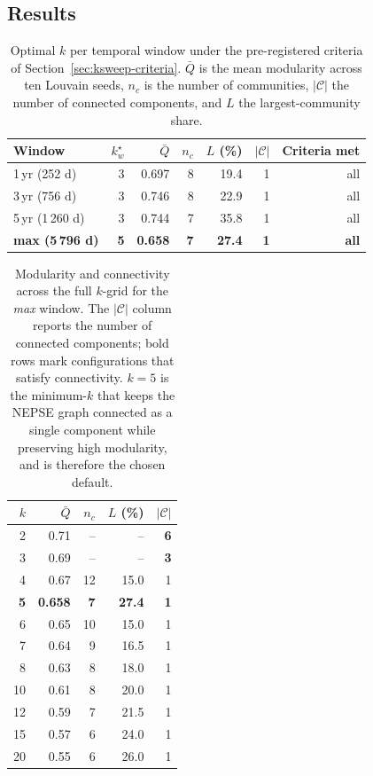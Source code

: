 \subsection{Results}
\label{sec:ksweep-results}

\begin{table}[H]
\centering
\small
\caption{Optimal $k$ per temporal window under the pre-registered
criteria of Section~\ref{sec:ksweep-criteria}.  $\bar Q$ is the mean
modularity across ten Louvain seeds, $n_c$ is the number of
communities, $|\mathcal{C}|$ the number of connected components, and
$L$ the largest-community share.}
\label{tab:ksweep-optimal}
\begin{tabular}{l r r r r r r}
\toprule
\textbf{Window} & $k^{\star}_w$ & $\bar Q$ & $n_c$ & $L$ (\%) & $|\mathcal{C}|$ & \textbf{Criteria met} \\
\midrule
1\,yr (252 d)   & 3 & 0.697 & 8 & 19.4 & 1 & all \\
3\,yr (756 d)   & 3 & 0.746 & 8 & 22.9 & 1 & all \\
5\,yr (1\,260 d) & 3 & 0.744 & 7 & 35.8 & 1 & all \\
\textbf{max (5\,796 d)} & \textbf{5} & \textbf{0.658} & \textbf{7} & \textbf{27.4} & \textbf{1} & \textbf{all} \\
\bottomrule
\end{tabular}
\end{table}

\begin{table}[H]
\centering
\footnotesize
\caption{Modularity and connectivity across the full $k$-grid for the
\emph{max} window.  The $|\mathcal{C}|$ column reports the number of
connected components; bold rows mark configurations that satisfy
connectivity.  $k=5$ is the minimum-$k$ that keeps the NEPSE graph
connected as a single component while preserving high modularity, and
is therefore the chosen default.}
\label{tab:ksweep-max}
\begin{tabular}{r r r r r}
\toprule
$k$ & $\bar Q$ & $n_c$ & $L$ (\%) & $|\mathcal{C}|$ \\
\midrule
2  & 0.71 & --  & --  & \textbf{6} \\
3  & 0.69 & --  & --  & \textbf{3} \\
4  & 0.67 & 12 & 15.0 & 1 \\
\textbf{5}  & \textbf{0.658} & \textbf{7} & \textbf{27.4} & \textbf{1} \\
6  & 0.65 & 10 & 15.0 & 1 \\
7  & 0.64 &  9 & 16.5 & 1 \\
8  & 0.63 &  8 & 18.0 & 1 \\
10 & 0.61 &  8 & 20.0 & 1 \\
12 & 0.59 &  7 & 21.5 & 1 \\
15 & 0.57 &  6 & 24.0 & 1 \\
20 & 0.55 &  6 & 26.0 & 1 \\
\bottomrule
\end{tabular}
\end{table}

